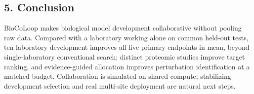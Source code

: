\begin{samepage}
\section*{5. Conclusion}
BioCoLoop makes biological model development collaborative without pooling raw data. Compared with a laboratory working alone on common held-out tests, ten-laboratory development improves all five primary endpoints in mean, beyond single-laboratory conventional search; distinct proteomic studies improve target ranking, and evidence-guided allocation improves perturbation identification at a matched budget. Collaboration is simulated on shared compute; stabilizing development selection and real multi-site deployment are natural next steps.
\par
\end{samepage}
